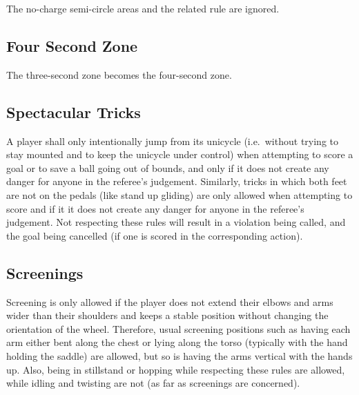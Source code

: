 The no-charge semi-circle areas and the related rule are ignored.

\subsection{Four Second Zone}
The three-second zone becomes the four-second zone.

\subsection{Spectacular Tricks}
A player shall only intentionally jump from its unicycle (i.e.\ without trying to stay mounted and to keep the unicycle under control) when attempting to score a goal or to save a ball going out of bounds, and only if it does not create any danger for anyone in the referee's judgement.
Similarly, tricks in which both feet are not on the pedals (like stand up gliding) are only allowed when attempting to score and if it it does not create any danger for anyone in the referee's judgement.
Not respecting these rules will result in a violation being called, and the goal being cancelled (if one is scored in the corresponding action).

\subsection{Screenings}
Screening is only allowed if the player does not extend their elbows and arms wider than their shoulders and keeps a stable position without changing
the orientation of the wheel. Therefore, usual screening positions such as having each arm either bent along the chest or lying along the torso 
(typically with the hand holding the saddle) are allowed, but so is having the arms vertical with the hands up. Also, being in stillstand or hopping while 
respecting these rules are allowed, while idling and twisting are not (as far as screenings are concerned).
